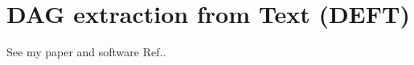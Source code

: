 \chapter{DAG extraction from Text (DEFT)}
\label{ch-deft}
See my paper and software Ref.\cite{deft-one}.
